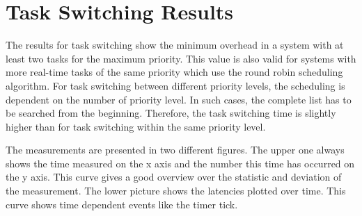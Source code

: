 \section{Task Switching Results}\label{s_task_switching_results}
The results for task switching show the minimum overhead in a system with at least two tasks for the maximum priority. 
This value is also valid for systems with more real-time tasks of the same priority which use the round robin scheduling algorithm.
For task switching between different priority levels, the scheduling is dependent on the number of priority level.
In such cases, the complete list has to be searched from the beginning.
Therefore, the task switching time is slightly higher than for task switching within the same priority level.
\par
The measurements are presented in two different figures. 
The upper one always shows the time measured on the x axis and the number this time has occurred on the y axis. 
This curve gives a good overview over the statistic and deviation of the measurement.
The lower picture shows the latencies plotted over time. 
This curve shows time dependent events like the timer tick.  

